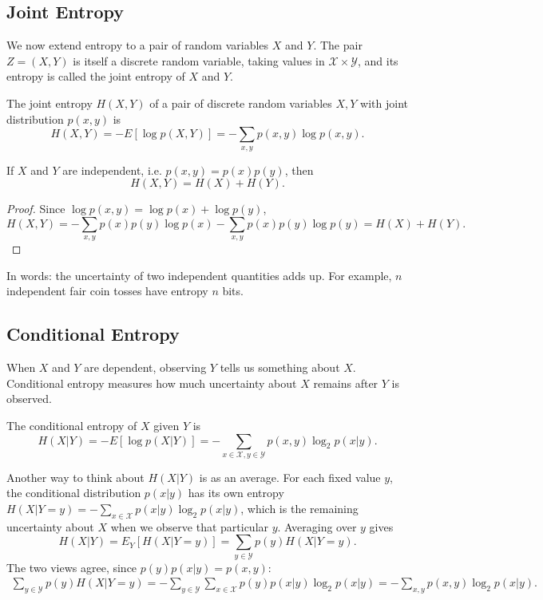 \subsection{Joint Entropy}
We now extend entropy to a pair of random variables \(X\) and \(Y\). The pair \(Z = (X,Y)\) is itself a discrete random variable, taking values in \(\mathcal{X} \times \mathcal{Y}\), and its entropy is called the joint entropy of \(X\) and \(Y\).

\begin{definition}
    The joint entropy \(H(X,Y)\) of a pair of discrete random variables \(X,Y\) with joint distribution \(p(x,y)\) is
    \[ H(X,Y) = -E[\log p(X,Y)] = -\sum_{x,y} p(x,y) \log p(x, y).\]
\end{definition}

\begin{theorem}\label{thm:indep_entropy}
If \(X\) and \(Y\) are independent, i.e. \(p(x,y) = p(x)p(y)\), then
\[H(X,Y) = H(X) + H(Y).\]
\end{theorem}
\begin{proof}
Since \(\log p(x,y) = \log p(x) + \log p(y)\),
\[H(X,Y) = -\sum_{x,y} p(x)p(y) \log p(x) - \sum_{x,y} p(x)p(y) \log p(y) = H(X) + H(Y).\]
\end{proof}
In words: the uncertainty of two independent quantities adds up. For example, \(n\) independent fair coin tosses have entropy \(n\) bits.

\subsection{Conditional Entropy}
When \(X\) and \(Y\) are dependent, observing \(Y\) tells us something about \(X\). Conditional entropy measures how much uncertainty about \(X\) remains after \(Y\) is observed.

\begin{definition}
The conditional entropy of \(X\) given \(Y\) is
\begin{equation}
H(X|Y) = - E[\log {p(X|Y)}] = - \sum_{x \in \mathcal{X}, y \in \mathcal{Y}} p(x,y) \log_{2} p(x|y). \label{eq:CondEntropy}
\end{equation}
\end{definition}

Another way to think about \(H(X|Y)\) is as an average. For each fixed value \(y\), the conditional distribution \(p(x|y)\) has its own entropy
\(H(X|Y=y) = -\sum_{x \in \mathcal{X}} p(x|y) \log_2 p(x|y)\), which is the remaining uncertainty about \(X\) when we observe that particular \(y\). Averaging over \(y\) gives
\begin{equation}
H(X|Y) = E_Y[H(X|Y=y)] = \sum_{y \in \mathcal{Y}} p(y) H(X|Y=y). \label{eq:CondEntropy2}
\end{equation}
The two views agree, since \(p(y)p(x|y) = p(x,y)\):
\begin{align*}
\sum_{y \in \mathcal{Y}} p(y) H(X|Y=y) = -\sum_{y \in \mathcal{Y}} \sum_{x \in \mathcal{X}} p(y) p(x|y) \log_2 p(x|y) = -\sum_{x,y} p(x,y) \log_2 p(x|y).
\end{align*}

